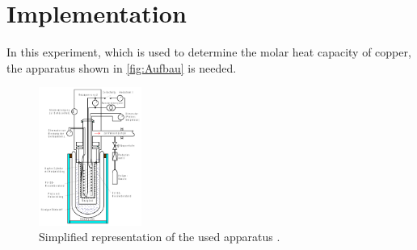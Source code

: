 \section{Implementation}
\label{sec:Aufbau}
In this experiment, which is used to determine the molar heat capacity of copper, the apparatus shown in \autoref{fig:Aufbau} is needed.

\begin{figure}
    \begin{center}
        \includegraphics[width=0.3\textwidth]{Aufbau.pdf}
        \caption{Simplified representation of the used apparatus \cite{ap47}.}
        \label{fig:Aufbau}
    \end{center} 
\end{figure}